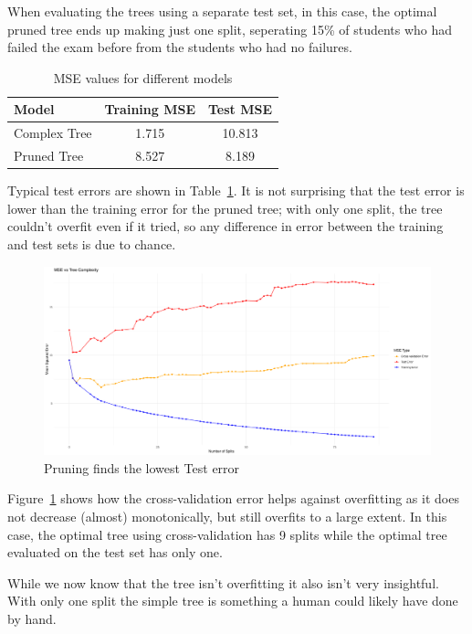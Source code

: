 \documentclass[12pt]{article}
\begin{document}
When evaluating the trees using a separate test set, in this case, the optimal pruned tree ends up making just one split, seperating 15\% of students who had failed the exam before from the students who had no failures.

\begin{table}
    \centering
    \begin{tabular}{| l | c | c |}
        \hline
        Model        & Training MSE & Test MSE \\
        \hline
        Complex Tree & 1.715        & 10.813   \\
        Pruned Tree  & 8.527        & 8.189    \\
        \hline
    \end{tabular}
    \caption{MSE values for different models}
    \label{table_pruning}
\end{table}

Typical test errors are shown in Table~\ref{table_pruning}. It is not surprising that the test error is lower than the training error for the pruned tree; with only one split, the tree couldn't overfit even if it tried, so any difference in error between the training and test sets is due to chance.

\begin{figure}
    \centering
    \includegraphics[scale=0.30]{triple_pruning_plot.pdf}
    \caption{Pruning finds the lowest Test error}
    \label{prune}
\end{figure}

Figure~\ref{prune} shows how the cross-validation error helps against overfitting as it does not decrease (almost) monotonically, but still overfits to a large extent. In this case, the optimal tree using cross-validation has 9 splits while the optimal tree evaluated on the test set has only one.

While we now know that the tree isn't overfitting it also isn't very insightful. With only one split the simple tree is something a human could likely have done by hand.
\end{document}
